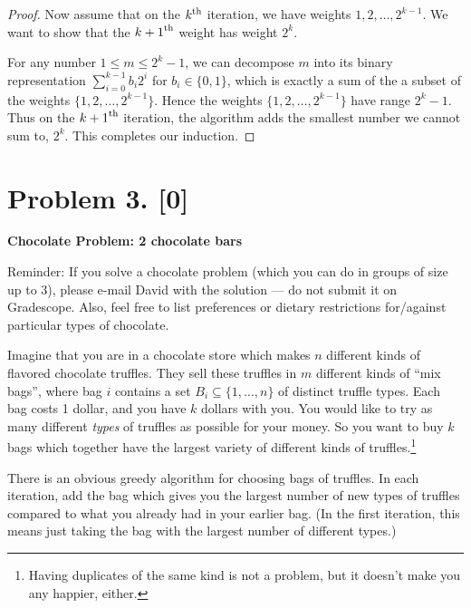 \documentclass[10pt]{article}
\providecommand{\Kth}[1]{\ensuremath{{#1}^{\rm th}}}
\begin{document}
\begin{enumerate}
\begin{proof}
  Now assume that on the \Kth{k} iteration, we have weights \(1, 2, \dots, 2^{k - 1}\). We want to show that the \Kth{k + 1} weight has weight \(2^k\).

  For any number \(1 \le m \le 2^k - 1\), we can decompose \(m\) into its binary representation \(\sum_{i = 0}^{k - 1} b_i 2^i\) for \(b_i \in \{0, 1\}\), which is exactly a sum of the a subset of the weights \(\{1, 2, \dots, 2^{k - 1}\}\). Hence the weights \(\{1, 2, \dots, 2^{k - 1}\}\) have range \(2^k - 1\). Thus on the \Kth{k + 1} iteration, the algorithm adds the smallest number we cannot sum to, \(2^k\). This completes our induction. 
\end{proof}

\end{enumerate}

\section*{Problem 3. [0]}
\textbf{Chocolate Problem: 2 chocolate bars}

Reminder: If you solve a chocolate problem (which you can do in groups of size up to 3), please e-mail David with the solution --- do not submit it on Gradescope. Also, feel free to list preferences or dietary restrictions for/against particular types of chocolate.

Imagine that you are in a chocolate store which makes $n$ different kinds of flavored chocolate truffles. They sell these truffles in $m$ different kinds of ``mix bags'', where bag $i$ contains a set $B_i \subseteq \{1, \ldots, n\}$ of distinct truffle types. Each bag costs 1 dollar, and you have $k$ dollars with you. You would like to try as many different \emph{types} of truffles as possible for your money. So you want to buy $k$ bags which together have the largest variety of different kinds of truffles.\footnote{Having duplicates of the same kind is not a problem, but it doesn't make you any happier, either.}

There is an obvious greedy algorithm for choosing bags of truffles. In each iteration, add the bag which gives you the largest number of new types of truffles compared to what you already had in your earlier bag. (In the first iteration, this means just taking the bag with the largest number of different types.)
\end{document}
